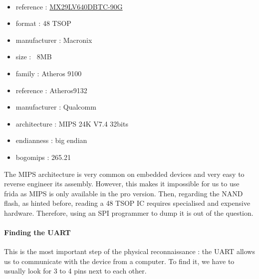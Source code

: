 \documentclass{article}
\begin{document}
\\
\begin{minipage}[t]{0.3\textwidth}
\end{minipage} %
\vspace{0.5cm}
\hfill
\begin{minipage}[t]{0.7\textwidth}
	\begin{itemize}
		\itemsep0em
		\item reference : \href{https://www.alldatasheet.com/datasheet-pdf/view/267962/MCNIX/MX29LV640DBTC-90G.html}{MX29LV640DBTC-90G}
		\item format : 48 TSOP
		\item manufacturer : Macronix
		\item size : ~8MB
	\end{itemize}
\end{minipage}
\begin{minipage}[t]{0.3\textwidth}
\end{minipage} %
\vspace{0.5cm}
\hfill
\begin{minipage}[t]{0.7\textwidth}
	\begin{itemize}
		\item family : Atheros 9100
		\item reference : Atheros9132
		\item manufacturer : Qualcomm
		\item architecture : MIPS 24K V7.4 32bits
		\item endianness : big endian
		\item bogomips : 265.21
	\end{itemize}
\end{minipage}
\noindent The MIPS architecture is very common on embedded devices and very easy to reverse engineer its assembly. However, this makes it impossible for us to use frida as MIPS is only available in the pro version. Then, regarding the NAND flash, as hinted before, reading a 48 TSOP IC requires specialised and expensive hardware. Therefore, using an SPI programmer to dump it is out of the question.
\paragraph{Finding the UART} This is the most important step of the physical reconnaissance : the UART allows us to communicate with the device from a computer. To find it, we have to usually look for 3 to 4 pins next to each other. 
\end{document}
